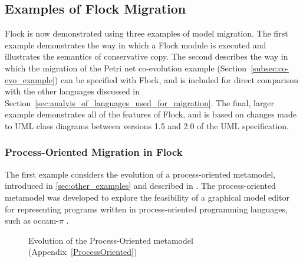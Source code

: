 \subsection{Examples of Flock Migration}
\label{subsec:flock_examples}
Flock is now demonstrated using three examples of model migration. The first example demonstrates the way in which a Flock module is executed and illustrates the semantics of conservative copy. The second describes the way in which the migration of the Petri net co-evolution example (Section~\ref{subsec:co-evo_example}) can be specified with Flock, and is included for direct comparison with the other languages discussed in Section~\ref{sec:analyis_of_languages_used_for_migration}. The final, larger example demonstrates all of the features of Flock, and is based on changes made to UML class diagrams between versions 1.5 and 2.0 of the UML specification.

\subsubsection{Process-Oriented Migration in Flock}
The first example considers the evolution of a process-oriented metamodel, introduced in \ref{sec:other_examples} and described in . The process-oriented metamodel was developed to explore the feasibility of a graphical model editor for representing programs written in process-oriented programming languages, such as occam-$\pi$ \cite{occam_pi}.

\begin{figure}[htb]
	\centering
	\caption[Evolution of the Process-Oriented metamodel]{Evolution of the Process-Oriented metamodel (Appendix~\ref{ProcessOriented})}
\label{fig:cc_eg_mms}
\end{figure}

